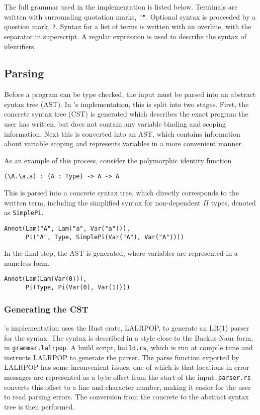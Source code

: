 \documentclass[12pt,a4paper,twoside]{report}
\begin{document}
The full grammar used in the implementation is listed below.
Terminals are written with surrounding quotation marks, \texttt{""}.
Optional syntax is proceeded by a question mark, \texttt{?}.
Syntax for a list of terms is written with an overline, with the separator in superscript.
A regular expression is used to describe the syntax of identifiers.
\concretesyntax

\subsection{Parsing}

Before a program can be type checked, the input must be parsed into an abstract syntax tree (AST).
In \pimu{}'s implementation, this is split into two stages.
First, the concrete syntax tree (CST) is generated which describes the exact program the user has written, but does not contain any variable binding and scoping information.
Next this is converted into an AST, which contains information about variable scoping and represents variables in a more convenient manner.

As an example of this process, consider the polymorphic identity function
\begin{lstlisting}
(\A.\a.a) : (A : Type) -> A -> A
\end{lstlisting}
This is parsed into a concrete syntax tree, which directly corresponds to the written term, including the simplified syntax for non-dependent \(\Pi\) types, denoted as \lstinline{SimplePi}.
\begin{lstlisting}
Annot(Lam("A", Lam("a", Var("a"))),
      Pi("A", Type, SimplePi(Var("A"), Var("A"))))
\end{lstlisting}
In the final step, the AST is generated, where variables are represented in a nameless form.
\begin{lstlisting}
Annot(Lam(Lam(Var(0))),
      Pi(Type, Pi(Var(0), Var(1))))
\end{lstlisting}

\subsubsection{Generating the CST}

\pimu{}'s implementation uses the Rust crate, LALRPOP, to generate an LR(1) parser for the syntax.
The syntax is described in a style close to the Backus-Naur form, in \texttt{grammar.lalrpop}.
A build script, \texttt{build.rs}, which is run at compile time and instructs LALRPOP to generate the parser.
The parse function exported by LALRPOP has some inconvenient issues, one of which is that locations in error messages are represented as a byte offset from the start of the input.
\texttt{parser.rs} converts this offset to a line and character number, making it easier for the user to read parsing errors.
The conversion from the concrete to the abstract syntax tree is then performed.
\end{document}
